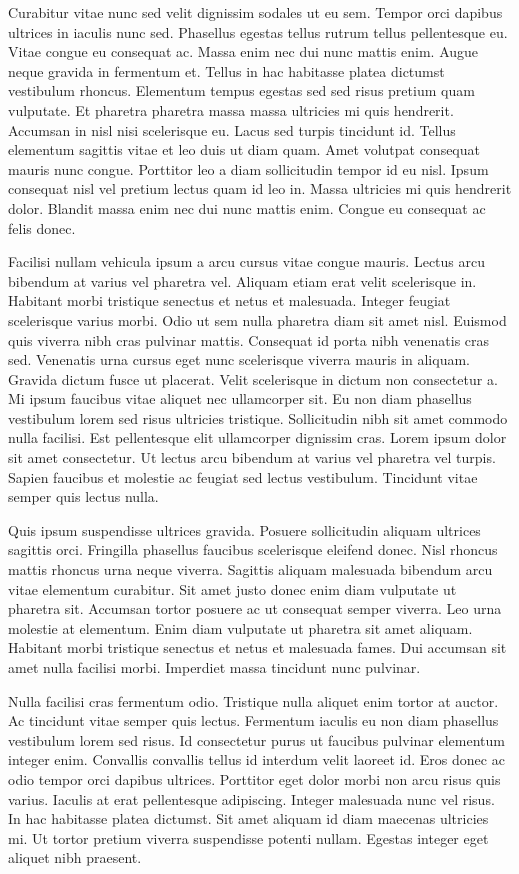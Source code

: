 \documentclass[11pt,a4paper]{article}
\begin{document}
Curabitur vitae nunc sed velit dignissim sodales ut eu sem. Tempor orci dapibus ultrices in iaculis nunc sed. Phasellus egestas tellus rutrum tellus pellentesque eu. Vitae congue eu consequat ac. Massa enim nec dui nunc mattis enim. Augue neque gravida in fermentum et. Tellus in hac habitasse platea dictumst vestibulum rhoncus. Elementum tempus egestas sed sed risus pretium quam vulputate. Et pharetra pharetra massa massa ultricies mi quis hendrerit. Accumsan in nisl nisi scelerisque eu. Lacus sed turpis tincidunt id. Tellus elementum sagittis vitae et leo duis ut diam quam. Amet volutpat consequat mauris nunc congue. Porttitor leo a diam sollicitudin tempor id eu nisl. Ipsum consequat nisl vel pretium lectus quam id leo in. Massa ultricies mi quis hendrerit dolor. Blandit massa enim nec dui nunc mattis enim. Congue eu consequat ac felis donec.

Facilisi nullam vehicula ipsum a arcu cursus vitae congue mauris. Lectus arcu bibendum at varius vel pharetra vel. Aliquam etiam erat velit scelerisque in. Habitant morbi tristique senectus et netus et malesuada. Integer feugiat scelerisque varius morbi. Odio ut sem nulla pharetra diam sit amet nisl. Euismod quis viverra nibh cras pulvinar mattis. Consequat id porta nibh venenatis cras sed. Venenatis urna cursus eget nunc scelerisque viverra mauris in aliquam. Gravida dictum fusce ut placerat. Velit scelerisque in dictum non consectetur a. Mi ipsum faucibus vitae aliquet nec ullamcorper sit. Eu non diam phasellus vestibulum lorem sed risus ultricies tristique. Sollicitudin nibh sit amet commodo nulla facilisi. Est pellentesque elit ullamcorper dignissim cras. Lorem ipsum dolor sit amet consectetur. Ut lectus arcu bibendum at varius vel pharetra vel turpis. Sapien faucibus et molestie ac feugiat sed lectus vestibulum. Tincidunt vitae semper quis lectus nulla.

Quis ipsum suspendisse ultrices gravida. Posuere sollicitudin aliquam ultrices sagittis orci. Fringilla phasellus faucibus scelerisque eleifend donec. Nisl rhoncus mattis rhoncus urna neque viverra. Sagittis aliquam malesuada bibendum arcu vitae elementum curabitur. Sit amet justo donec enim diam vulputate ut pharetra sit. Accumsan tortor posuere ac ut consequat semper viverra. Leo urna molestie at elementum. Enim diam vulputate ut pharetra sit amet aliquam. Habitant morbi tristique senectus et netus et malesuada fames. Dui accumsan sit amet nulla facilisi morbi. Imperdiet massa tincidunt nunc pulvinar.

Nulla facilisi cras fermentum odio. Tristique nulla aliquet enim tortor at auctor. Ac tincidunt vitae semper quis lectus. Fermentum iaculis eu non diam phasellus vestibulum lorem sed risus. Id consectetur purus ut faucibus pulvinar elementum integer enim. Convallis convallis tellus id interdum velit laoreet id. Eros donec ac odio tempor orci dapibus ultrices. Porttitor eget dolor morbi non arcu risus quis varius. Iaculis at erat pellentesque adipiscing. Integer malesuada nunc vel risus. In hac habitasse platea dictumst. Sit amet aliquam id diam maecenas ultricies mi. Ut tortor pretium viverra suspendisse potenti nullam. Egestas integer eget aliquet nibh praesent.
\end{document}
